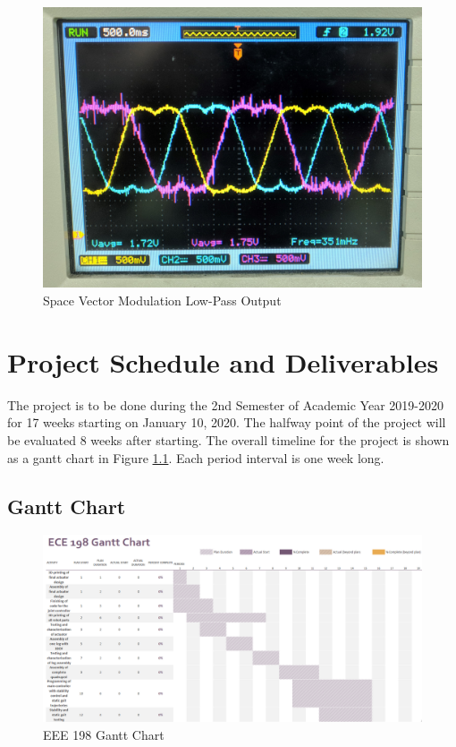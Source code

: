 \documentclass[english]{upeeei}
\begin{document}
\begin{figure}[H]
\begin{centering}
\includegraphics[width=0.7\columnwidth]{images/svm}
\par\end{centering}
\caption{Space Vector Modulation Low-Pass Output\label{fig:svm-output}}
\end{figure}

\cleardoublepage{}

\chapter{Project Schedule and Deliverables\label{cha:Project-Sked}}

The project is to be done during the 2nd Semester of Academic Year 2019-2020 for 17 weeks starting on January 10, 2020. The halfway point of the project will be evaluated 8 weeks after starting. The overall timeline for the project is shown as a gantt chart in Figure \ref{fig:gantt-chart}. Each period interval is one week long.

\section{Gantt Chart }

\begin{figure}[H]
\begin{centering}
\includegraphics[width=1.0\columnwidth]{images/gantt_chart}
\par\end{centering}
\caption{EEE 198 Gantt Chart\label{fig:gantt-chart}}
\end{figure}
\end{document}
